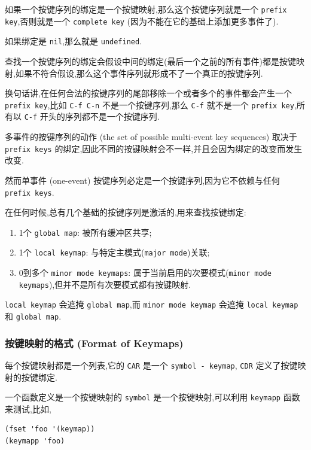 \documentclass[11pt]{article}
\begin{document}
如果一个按键序列的绑定是一个按键映射,那么这个按键序列就是一个 \texttt{prefix key},否则就是一个 \texttt{complete key} (因为不能在它的基础上添加更多事件了).

如果绑定是 \texttt{nil},那么就是 \texttt{undefined}.

查找一个按键序列的绑定会假设中间的绑定(最后一个之前的所有事件)都是按键映射,如果不符合假设,那么这个事件序列就形成不了一个真正的按键序列.

换句话讲,在任何合法的按键序列的尾部移除一个或者多个的事件都会产生一个 \texttt{prefix key},比如 \texttt{C-f C-n} 不是一个按键序列,那么 \texttt{C-f} 就不是一个 \texttt{prefix key},所有以 \texttt{C-f} 开头的序列都不是一个按键序列.

多事件的按键序列的动作 (the set of possible multi-event key sequences) 取决于 \texttt{prefix keys} 的绑定,因此不同的按键映射会不一样,并且会因为绑定的改变而发生改变.

然而单事件 (one-event) 按键序列必定是一个按键序列,因为它不依赖与任何 \texttt{prefix keys}.

在任何时候,总有几个基础的按键序列是激活的,用来查找按键绑定:

\begin{enumerate}
\item 1个 \texttt{global map}: 被所有缓冲区共享;
\item 1个 \texttt{local keymap}: 与特定主模式(\texttt{major mode})关联;
\item 0到多个 \texttt{minor mode keymaps}: 属于当前启用的次要模式(\texttt{minor mode keymaps}),但并不是所有次要模式都有按键映射.
\end{enumerate}

\texttt{local keymap} 会遮掩 \texttt{global map},而 \texttt{minor mode keymap} 会遮掩 \texttt{local keymap} 和 \texttt{global map}.


\subsubsection{按键映射的格式 (Format of Keymaps)}
\label{sec:orgb384c46}

每个按键映射都是一个列表,它的 \texttt{CAR} 是一个 \texttt{symbol - keymap}, \texttt{CDR} 定义了按键映射的按键绑定.

一个函数定义是一个按键映射的 \texttt{symbol} 是一个按键映射,可以利用 \texttt{keymapp} 函数来测试,比如,

\begin{verbatim}
(fset 'foo '(keymap))
(keymapp 'foo)
\end{verbatim}
\end{document}
